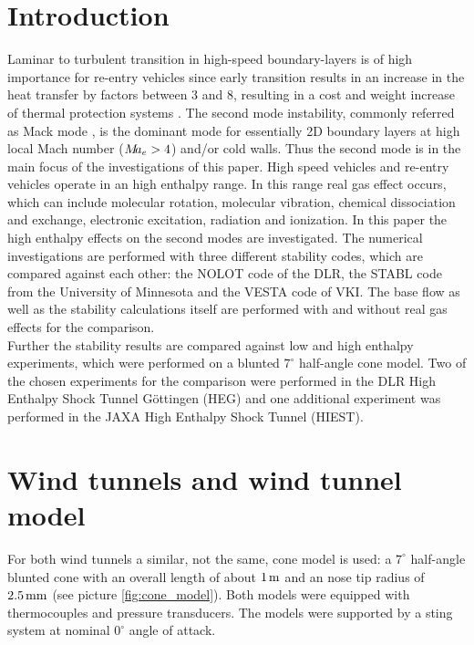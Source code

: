 \documentclass[]{aiaa-tc}%
\begin{document}
\section{Introduction}

Laminar to turbulent transition in high-speed boundary-layers is of high importance for re-entry vehicles since early transition results in an increase in the heat transfer by factors between 3 and 8, resulting in a cost and weight increase of thermal protection systems \cite{Schneider_1999,Schneider_2004}. The second mode instability, commonly referred as Mack mode \cite{Mack_1984}, is the dominant mode for essentially 2D boundary layers at high local Mach number ($M\hspace{-0.08cm} a_e > 4$) and/or cold walls\cite{Mack_1984}. Thus the second mode is in the main focus of the investigations of this paper. High speed vehicles and re-entry vehicles operate in an high enthalpy range. In this range real gas effect occurs, which can include molecular rotation, molecular vibration, chemical dissociation and exchange, electronic excitation, radiation and ionization. In this paper the high enthalpy effects on the second modes are investigated. The numerical investigations are performed with three different stability codes, which are compared against each other: the NOLOT code of the DLR, the STABL code from the University of Minnesota and the VESTA code of VKI. The base flow as well as the stability calculations itself are performed with and without real gas effects for the comparison.\\

Further the stability results are compared against low and high enthalpy experiments, which were performed on a blunted $7^\circ$ half-angle cone model. Two of the chosen experiments for the comparison were performed in the DLR High Enthalpy Shock Tunnel G\"ottingen (HEG) and one additional experiment was performed in the JAXA High Enthalpy Shock Tunnel (HIEST).

\section{Wind tunnels and wind tunnel model}\label{sect:model}
For both wind tunnels a similar, not the same, cone model is used: a $7^\circ$ half-angle blunted cone with an overall length of about $1 \hspace{0.05cm} \rm m$ and an nose tip radius of $2.5\hspace{0.05cm} \rm mm$ (see picture \ref{fig:cone_model}). Both models were equipped with thermocouples and pressure transducers. The models were supported by a sting system at nominal $0^\circ$ angle of attack.\\
\end{document}
